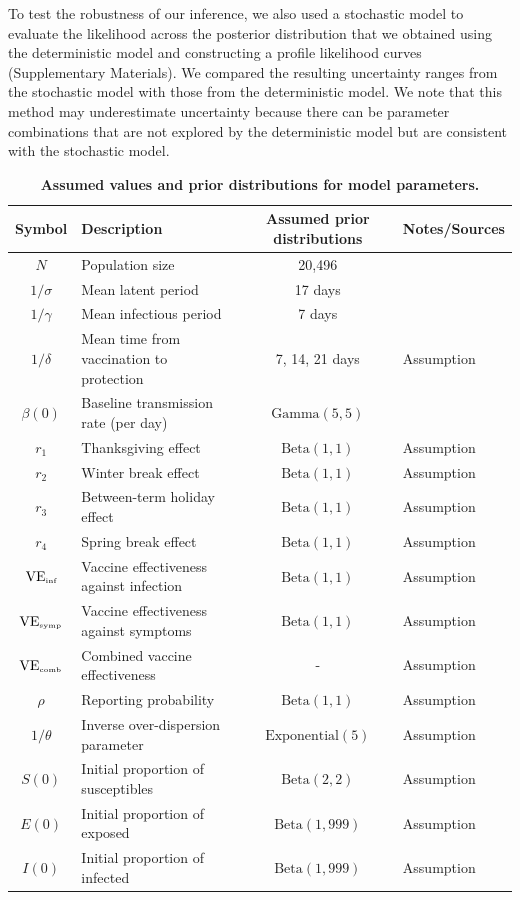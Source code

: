\documentclass[12pt]{article}
\begin{document}
To test the robustness of our inference, we also used a stochastic model to evaluate the likelihood across the posterior distribution that we obtained using the deterministic model and constructing a profile likelihood curves (Supplementary Materials).
We compared the resulting uncertainty ranges from the stochastic model with those from the deterministic model.
We note that this method may underestimate uncertainty because there can be parameter combinations that are not explored by the deterministic model but are consistent with the stochastic model.

\begin{table}[!t]
\begin{center}
\scriptsize
\begin{tabular}{c|p{6cm}|c|l}
Symbol & Description & Assumed prior distributions & Notes/Sources\\
\hline
$N$ & Population size & 20,496 & \citep{cardemil2017effectiveness} \\
$1/\sigma$ & Mean latent period & 17 days & \cite{galazka1999mumps,lewnard2018vaccine} \\
$1/\gamma$ & Mean infectious period & 7 days & \cite{galazka1999mumps,lewnard2018vaccine} \\
$1/\delta$ & Mean time from vaccination to protection & 7, 14, 21 days & Assumption \\
$\beta(0)$ & Baseline transmission rate (per day) & $\textrm{Gamma}(5, 5)$ & \cite{lewnard2018vaccine} \\
$r_1$ & Thanksgiving effect & $\textrm{Beta}(1, 1)$ & Assumption \\
$r_2$ & Winter break effect & $\textrm{Beta}(1, 1)$ & Assumption \\
$r_3$ & Between-term holiday effect & $\textrm{Beta}(1, 1)$ & Assumption \\
$r_4$ & Spring break effect & $\textrm{Beta}(1, 1)$ & Assumption \\
$\mathrm{VE}_{\textrm{\tiny{inf}}}$ & Vaccine effectiveness against infection & $\textrm{Beta}(1, 1)$ & Assumption \\
$\mathrm{VE}_{\textrm{\tiny{symp}}}$ & Vaccine effectiveness against symptoms & $\textrm{Beta}(1, 1)$ & Assumption \\
$\mathrm{VE}_{\textrm{\tiny{comb}}}$ & Combined vaccine effectiveness & - & Assumption \\
$\rho$ & Reporting probability & $\textrm{Beta}(1, 1)$ & Assumption \\
$1/\theta$ & Inverse over-dispersion parameter & $\textrm{Exponential}(5)$ & Assumption \\
$S(0)$ & Initial proportion of susceptibles & $\textrm{Beta}(2, 2)$ & Assumption \\
$E(0)$ & Initial proportion of exposed & $\textrm{Beta}(1, 999)$ & Assumption \\
$I(0)$ & Initial proportion of infected & $\textrm{Beta}(1, 999)$ & Assumption \\
\hline
\end{tabular}
\caption{
\textbf{Assumed values and prior distributions for model parameters.}
}
\end{center}
\end{table}
\end{document}
